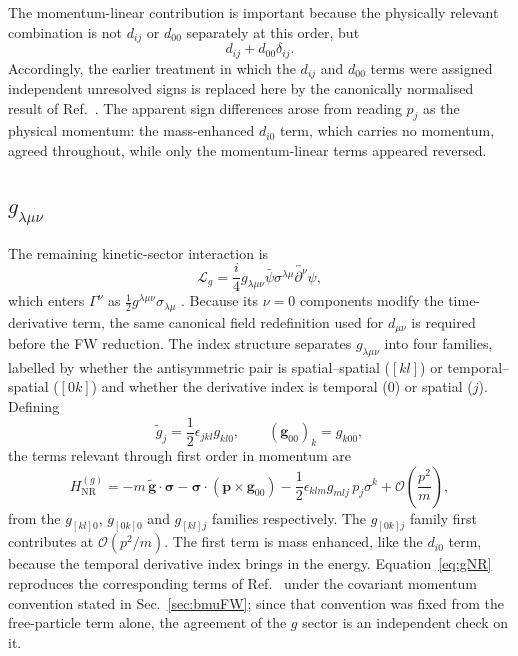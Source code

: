 \documentclass[aps,prd,reprint,superscriptaddress,nofootinbib]{revtex4-2}
\newcommand{\NR}{\mathrm{NR}}
\begin{document}
	The momentum-linear contribution is important because the physically
	relevant combination is not $d_{ij}$ or $d_{00}$ separately at this
	order, but
	\begin{equation}
		d_{ij}+d_{00}\delta_{ij}.
		\label{eq:dcombination}
	\end{equation}
	Accordingly, the earlier treatment in which the $d_{ij}$ and $d_{00}$
terms were assigned independent unresolved signs is replaced here by the
canonically normalised result of Ref.~\cite{KosteleckyLane1999}. The
apparent sign differences arose from reading $p_j$ as the physical
momentum: the mass-enhanced $d_{i0}$ term, which carries no momentum,
agreed throughout, while only the momentum-linear terms appeared
reversed.
	
	\subsection{$g_{\lambda\mu\nu}$}

The remaining kinetic-sector interaction is
\begin{equation}
	\mathcal L_g
	=
	\frac{i}{4}
	g_{\lambda\mu\nu}
	\bar\psi\sigma^{\lambda\mu}
	\overleftrightarrow{\partial^\nu}\psi ,
	\label{eq:Lg}
\end{equation}
which enters $\Gamma^\nu$ as $\tfrac12 g^{\lambda\mu\nu}\sigma_{\lambda\mu}$
\cite{KosteleckyLane1999}. Because its $\nu=0$ components modify the
time-derivative term, the same canonical field redefinition used for
$d_{\mu\nu}$ is required before the FW reduction. The index structure
separates $g_{\lambda\mu\nu}$ into four families, labelled by whether the
antisymmetric pair is spatial--spatial ($[kl]$) or temporal--spatial
($[0k]$) and whether the derivative index is temporal ($0$) or
spatial ($j$). Defining
\begin{equation}
	\tilde g_j=\frac12\epsilon_{jkl}g_{kl0},
	\qquad
	(\mathbf g_{00})_k=g_{k00},
\end{equation}
the terms relevant through first order in momentum are
\begin{equation}
	H_{\NR}^{(g)}
	=
	-m\,\tilde{\mathbf g}\cdot\boldsymbol{\sigma}
	-\boldsymbol{\sigma}\cdot(\mathbf p\times\mathbf g_{00})
	-\frac12\epsilon_{klm}g_{mlj}\,p_j\sigma^k
	+\mathcal O\!\left(\frac{p^2}{m}\right),
	\label{eq:gNR}
\end{equation}
from the $g_{[kl]0}$, $g_{[0k]0}$ and $g_{[kl]j}$ families
respectively. The $g_{[0k]j}$ family first contributes at
$\mathcal O(p^2/m)$. The first term is mass enhanced, like the $d_{i0}$
term, because the temporal derivative index brings in the energy.
Equation~\eqref{eq:gNR} reproduces the corresponding terms of
Ref.~\cite{KosteleckyLane1999} under the covariant momentum convention
stated in Sec.~\ref{sec:bmuFW}; since that convention was fixed from the
free-particle term alone, the agreement of the $g$ sector is an
independent check on it.
\end{document}
